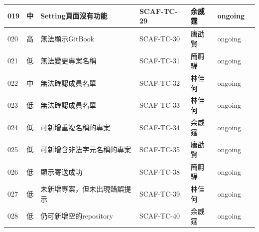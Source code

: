 \documentclass{report}
\begin{document}
\\
\newline
\\
\begin{tabularx}{\textwidth}{
  |p{}%
  |p{}%
  |p{}%
  |p{}%
  |p{}%
  |p{}%
  |p{}|%
}
  \hline
  019 & 中 & Setting頁面沒有功能 & SCAF-TC-29 & 余威霆 & ongoing & \\
  \hline
  020 & 高 & 無法顯示GitBook & SCAF-TC-30 & 唐劭賢 & ongoing & \\
  \hline
  021 & 低 & 無法變更專案名稱 & SCAF-TC-31 & 簡蔚驊 & ongoing & \\
  \hline
  022 & 中 & 無法確認成員名單 & SCAF-TC-32 & 林佳何 & ongoing & \\
  \hline
  023 & 低 & 無法確認成員名單 & SCAF-TC-33 & 林佳何 & ongoing & \\
  \hline
  024 & 低 & 可新增重複名稱的專案 & SCAF-TC-34 & 余威霆 & ongoing & \\
  \hline
  025 & 低 & 可新增含非法字元名稱的專案 & SCAF-TC-35 & 唐劭賢  & ongoing & \\
  \hline
  026 & 低 & 顯示寄送成功 & SCAF-TC-38 & 簡蔚驊 & ongoing & \\
  \hline
  027 & 低 & 未新增專案，但未出現錯誤提示 & SCAF-TC-39 & 林佳何 & ongoing & \\
  \hline
  028 & 低 & 仍可新增空的repository & SCAF-TC-40 & 余威霆 & ongoing & \\
  \hline
\end{tabularx}
\\
\newline
\\
\end{document}
